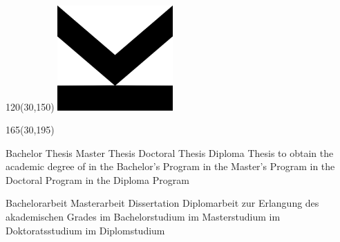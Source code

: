 
\begin{textblock}{120}(30,150)
	\includegraphics[width=44mm]{cover/arr}
\end{textblock}

\begin{textblock}{165}(30,195)
	\begin{minipage}[t]{120mm}
		\Large
		\ifeng
		\ifcase\type
			\ifdefined\subtitle
				\LARGE
				\subtitle
			\else
				\relax
			\fi
		\or Bachelor Thesis
		\or Master Thesis
		\or Doctoral Thesis
		\or Diploma Thesis
		\fi
		\vskip1mm
		\ifcase\type
			\relax
			\else
			{
				\normalsize to obtain the academic degree of
			}
			\vskip2mm
		\fi
		\ifcase\type
		\relax
		\else
		\acadDegree
		\vskip1mm
		\fi
		{
			\normalsize
			\ifcase\type
				\relax
			\or in the Bachelor's Program
			\or in the Master's Program
			\or in the Doctoral Program
			\or in the Diploma Program
			\fi
		}
		\vskip2mm
		\ifcase\type
			\relax
		\else
			\study
		\fi
		\else
		\ifcase\type
			\ifdefined\subtitle
				\LARGE\subtitle
			\else
				\relax
			\fi
		\or Bachelorarbeit
		\or Masterarbeit
		\or Dissertation
		\or Diplomarbeit%
		\fi
		\vskip1mm
		\ifcase\type%
			\relax
			\else
			{
				\normalsize zur Erlangung des akademischen Grades
			}
			\vskip2mm
		\fi
		\ifcase\type%
			\relax
		\else
			\acadDegree \vskip1mm%
			\fi
			{
				\normalsize
				\ifcase\type%
					\relax
				\or im Bachelorstudium%
				\or im Masterstudium%
				\or im Doktoratsstudium%
				\or im Diplomstudium%
				\fi
			} \vskip2mm
			\ifcase\type%
				\relax
			\else
				\study%
			\fi
		\fi
	\end{minipage}
\end{textblock}
